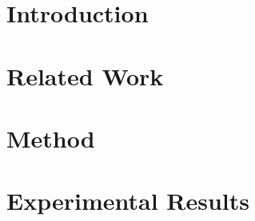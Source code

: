 \documentclass[sigconf]{acmart}  %
\begin{document}

\maketitle

\section{Introduction} \label{sec:intro}




% 

\section{Related Work} \label{sec:relatedWork}



\section{Method} \label{sec:method}



\section{Experimental Results} \label{sec:results}



\end{document}
